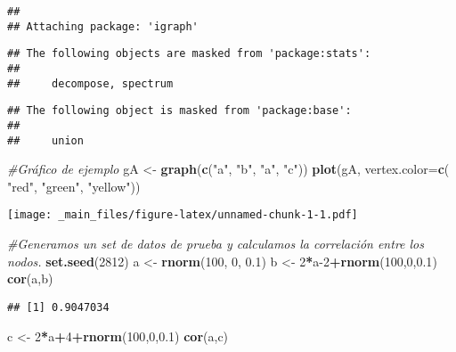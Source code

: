 \documentclass[
]{book}
\newenvironment{Shaded}{\begin{snugshade}}{\end{snugshade}}
\newcommand{\CommentTok}[1]{\textcolor[rgb]{0.56,0.35,0.01}{\textit{#1}}}
\newcommand{\DataTypeTok}[1]{\textcolor[rgb]{0.13,0.29,0.53}{#1}}
\newcommand{\DecValTok}[1]{\textcolor[rgb]{0.00,0.00,0.81}{#1}}
\newcommand{\FloatTok}[1]{\textcolor[rgb]{0.00,0.00,0.81}{#1}}
\newcommand{\KeywordTok}[1]{\textcolor[rgb]{0.13,0.29,0.53}{\textbf{#1}}}
\newcommand{\NormalTok}[1]{#1}
\newcommand{\OperatorTok}[1]{\textcolor[rgb]{0.81,0.36,0.00}{\textbf{#1}}}
\newcommand{\StringTok}[1]{\textcolor[rgb]{0.31,0.60,0.02}{#1}}
\begin{document}
\begin{verbatim}
## 
## Attaching package: 'igraph'
\end{verbatim}

\begin{verbatim}
## The following objects are masked from 'package:stats':
## 
##     decompose, spectrum
\end{verbatim}

\begin{verbatim}
## The following object is masked from 'package:base':
## 
##     union
\end{verbatim}

\begin{Shaded}
\begin{Highlighting}[]
\CommentTok{#Gráfico de ejemplo}
\NormalTok{gA <-}\StringTok{ }\KeywordTok{graph}\NormalTok{(}\KeywordTok{c}\NormalTok{(}\StringTok{"a"}\NormalTok{, }\StringTok{"b"}\NormalTok{, }\StringTok{"a"}\NormalTok{, }\StringTok{"c"}\NormalTok{))}
\KeywordTok{plot}\NormalTok{(gA, }\DataTypeTok{vertex.color=}\KeywordTok{c}\NormalTok{( }\StringTok{"red"}\NormalTok{, }\StringTok{"green"}\NormalTok{, }\StringTok{"yellow"}\NormalTok{))}
\end{Highlighting}
\end{Shaded}

\texttt{[image: \_main\_files/figure-latex/unnamed-chunk-1-1.pdf]}

\begin{Shaded}
\begin{Highlighting}[]
\CommentTok{#Generamos un set de datos de prueba y calculamos la correlación entre los nodos.}
\KeywordTok{set.seed}\NormalTok{(}\DecValTok{2812}\NormalTok{)}
\NormalTok{a <-}\StringTok{ }\KeywordTok{rnorm}\NormalTok{(}\DecValTok{100}\NormalTok{, }\DecValTok{0}\NormalTok{, }\FloatTok{0.1}\NormalTok{)}
\NormalTok{b <-}\StringTok{ }\DecValTok{2}\OperatorTok{*}\NormalTok{a}\DecValTok{-2}\OperatorTok{+}\KeywordTok{rnorm}\NormalTok{(}\DecValTok{100}\NormalTok{,}\DecValTok{0}\NormalTok{,}\FloatTok{0.1}\NormalTok{)}
\KeywordTok{cor}\NormalTok{(a,b)}
\end{Highlighting}
\end{Shaded}

\begin{verbatim}
## [1] 0.9047034
\end{verbatim}

\begin{Shaded}
\begin{Highlighting}[]
\NormalTok{c <-}\StringTok{ }\DecValTok{2}\OperatorTok{*}\NormalTok{a}\OperatorTok{+}\DecValTok{4}\OperatorTok{+}\KeywordTok{rnorm}\NormalTok{(}\DecValTok{100}\NormalTok{,}\DecValTok{0}\NormalTok{,}\FloatTok{0.1}\NormalTok{)}
\KeywordTok{cor}\NormalTok{(a,c)}
\end{Highlighting}
\end{Shaded}
\end{document}
